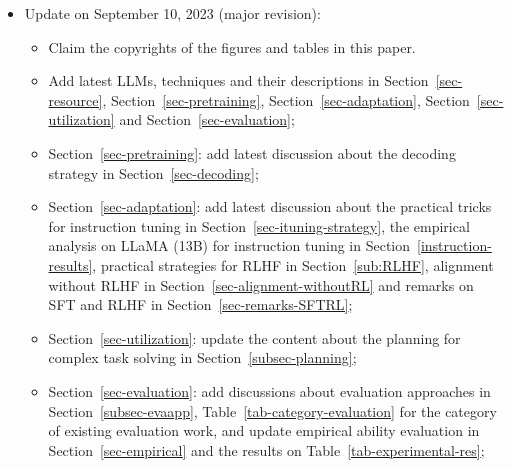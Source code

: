 {\begin{itemize}
\begin{itemize}
\item  Section~\ref{sec-adaptation}: add latest discussion about the synthetic data formatting of instruction tuning in Section~\ref{sec-instruction-formatted},  the empirical analysis for instruction tuning in Section~\ref{instruction-results},   parameter-efficient model adaptation in Section~\ref{sec-PEFT} and memory-efficient adaptation in Section~\ref{sec-PEFT};
\item Section~\ref{sec-utilization}: add latest discussion about the underlying mechanism of ICL~\ref{sec-ICL-mechanism},  planning for complex task solving in Section~\ref{subsec-planning};
\item Section~\ref{sec-evaluation}: update Table~\ref{tab:dataset} for representative datasets for evaluating advanced abilities of LLMs, and empirical ability evaluation in Section~\ref{sec-empirical};
\item  Section~\ref{subsec:promptdesign}: add prompt design;
\item  Section~\ref{sec-application}: add the discussions on applications of LLMs in finance and scientific research domains;
\end{itemize}
\item {Update on September 10, 2023 (major revision): }
\begin{itemize}
\item 

{Claim the copyrights of the figures and tables in this paper.}
\item 
{Add latest LLMs, techniques and their descriptions in Section~\ref{sec-resource}, Section~\ref{sec-pretraining}, Section~\ref{sec-adaptation}, Section~\ref{sec-utilization} and Section~\ref{sec-evaluation};}
\item {Section~\ref{sec-pretraining}: add latest discussion about the decoding strategy in Section~\ref{sec-decoding};}
\item {Section~\ref{sec-adaptation}: add latest discussion about the practical tricks for instruction tuning in Section~\ref{sec-ituning-strategy}, the empirical analysis on LLaMA (13B) for instruction tuning in Section~\ref{instruction-results}, practical strategies for RLHF in Section~\ref{sub:RLHF},  alignment without RLHF in Section~\ref{sec-alignment-withoutRL} and remarks on SFT and RLHF in Section~\ref{sec-remarks-SFTRL};}
\item {Section~\ref{sec-utilization}: update the content about the planning for complex task solving in Section~\ref{subsec-planning};}
\item {Section~\ref{sec-evaluation}: add  discussions about evaluation approaches in Section~\ref{subsec-evaapp}, Table~\ref{tab-category-evaluation} for the category of existing evaluation work, and update empirical ability evaluation in Section~\ref{sec-empirical} and the results on Table~\ref{tab-experimental-res};}


\end{itemize}
\end{itemize}}
